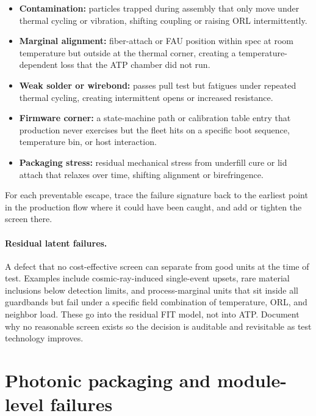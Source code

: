 \begin{itemize}
\item \textbf{Contamination:} particles trapped during assembly that only move under
      thermal cycling or vibration, shifting coupling or raising ORL intermittently.
\item \textbf{Marginal alignment:} fiber-attach or FAU position within spec at room
      temperature but outside at the thermal corner, creating a
      temperature-dependent loss that the ATP chamber did not run.
\item \textbf{Weak solder or wirebond:} passes pull test but fatigues under
      repeated thermal cycling, creating intermittent opens or increased resistance.
\item \textbf{Firmware corner:} a state-machine path or calibration table entry that
      production never exercises but the fleet hits on a specific boot sequence,
      temperature bin, or host interaction.
\item \textbf{Packaging stress:} residual mechanical stress from underfill cure or
      lid attach that relaxes over time, shifting alignment or birefringence.
\end{itemize}

For each preventable escape, trace the failure signature back to the earliest point
in the production flow where it could have been caught, and add or tighten the
screen there.


\paragraph{Residual latent failures.}
A defect that no cost-effective screen can separate from good units at the time of
test. Examples include cosmic-ray-induced single-event upsets, rare material
inclusions below detection limits, and process-marginal units that sit inside all
guardbands but fail under a specific field combination of temperature, ORL, and
neighbor load. These go into the residual FIT model, not into ATP. Document why no
reasonable screen exists so the decision is auditable and revisitable as test
technology improves.

\section{Photonic packaging and module-level failures}
\label{sec:photonic-packaging}

